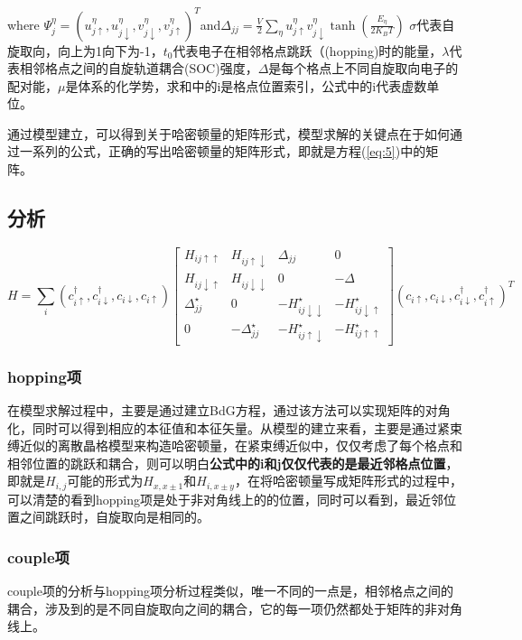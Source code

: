 \documentclass[a4paper,12pt]{ctexart}
\numberwithin{equation}{section}
\begin{document}
where  $\Psi_j^\eta=(u_{j\uparrow}^\eta,u_{j\downarrow}^\eta,v_{j\downarrow}^\eta,v_{j\uparrow}^\eta)^T$and$\Delta_{jj}=\frac{V}{2}\sum_\eta u_{j\uparrow}^\eta v_{j\downarrow}^\eta\tanh(\frac{E_\eta}{2K_BT})$
$\sigma$代表自旋取向，向上为1向下为-1，$t_0$代表电子在相邻格点跳跃（(hopping)时的能量，$\lambda$代表相邻格点之间的自旋轨道耦合(SOC)强度，$\Delta$是每个格点上不同自旋取向电子的配对能，$\mu$是体系的化学势，求和中的i是格点位置索引，公式中的i代表虚数单位。

通过模型建立，可以得到关于哈密顿量的矩阵形式，模型求解的关键点在于如何通过一系列的公式，正确的写出哈密顿量的矩阵形式，即就是方程(\ref{eq:5})中的矩阵。
\subsection{分析}
\begin{equation}
H=\sum_i(c_{i\uparrow}^\dagger,c_{i\downarrow}^\dagger,c_{i\downarrow},c_{i\uparrow}) \left[
\begin{array}{cccc}
H_{ij\uparrow\uparrow}&H_{ij\uparrow\downarrow}&\Delta_{jj}&0\\
H_{ij\downarrow\uparrow}&H_{ij\downarrow\downarrow}&0&-\Delta\\
\Delta_{jj}^\star&0&-H_{ij\downarrow\downarrow}^\star&-H_{ij\downarrow\uparrow}^\star\\
0&-\Delta_{jj}^\star&-H_{ij\uparrow\downarrow}^\star&-H_{ij\uparrow\uparrow}^\star
\end{array}
\right](c_{i\uparrow},c_{i\downarrow},c_{i\downarrow}^\dagger,c_{i\uparrow}^\dagger)^T
\end{equation}\label{eq6}
\subsubsection{hopping项}
在模型求解过程中，主要是通过建立BdG方程，通过该方法可以实现矩阵的对角化，同时可以得到相应的本征值和本征矢量。从模型的建立来看，主要是通过紧束缚近似的离散晶格模型来构造哈密顿量，在紧束缚近似中，仅仅考虑了每个格点和相邻位置的跳跃和耦合，则可以明白\textbf{公式中的i和j仅仅代表的是最近邻格点位置}，即就是$H_{i,j}$可能的形式为$H_{x,x\pm1}$和$H_{i,x\pm y}$，在将哈密顿量写成矩阵形式的过程中，可以清楚的看到hopping项是处于非对角线上的的位置，同时可以看到，最近邻位置之间跳跃时，自旋取向是相同的。
\subsubsection{couple项}
couple项的分析与hopping项分析过程类似，唯一不同的一点是，相邻格点之间的耦合，涉及到的是不同自旋取向之间的耦合，它的每一项仍然都处于矩阵的非对角线上。
\end{document}
